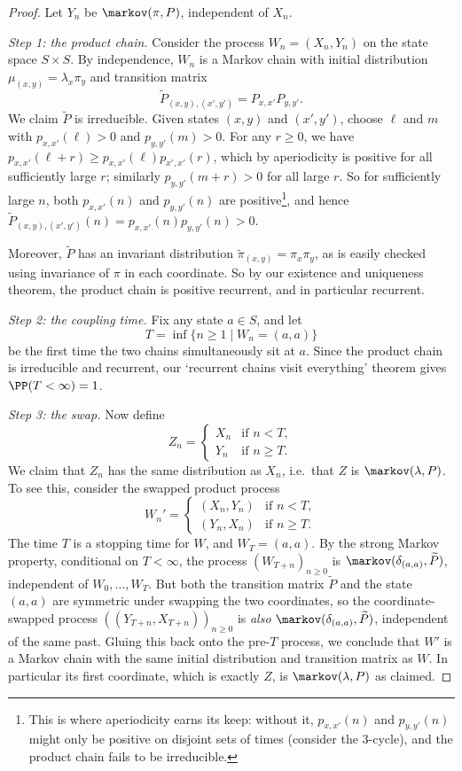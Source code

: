 \documentclass[a4paper]{scrartcl}
\begin{document}
\begin{proof}
	Let $Y_n$ be $\markov(\pi, P)$, independent of $X_n$.

	\emph{Step 1: the product chain.} Consider the process $W_n = (X_n, Y_n)$ on the state space $S \times S$. By independence, $W_n$ is a Markov chain with initial distribution $\mu_{(x, y)} = \lambda_x \pi_y$ and transition matrix
	$$
	\widetilde{P}_{(x, y), (x', y')} = P_{x, x'}P_{y, y'}.
	$$
	We claim $\widetilde{P}$ is irreducible. Given states $(x, y)$ and $(x', y')$, choose $\ell$ and $m$ with $p_{x, x'}(\ell) > 0$ and $p_{y, y'}(m) > 0$. For any $r \geq 0$, we have $p_{x, x'}(\ell + r) \geq p_{x, x'}(\ell)p_{x', x'}(r)$, which by aperiodicity is positive for all sufficiently large $r$; similarly $p_{y, y'}(m + r) > 0$ for all large $r$. So for sufficiently large $n$, both $p_{x, x'}(n)$ and $p_{y, y'}(n)$ are positive\footnote{This is where aperiodicity earns its keep: without it, $p_{x, x'}(n)$ and $p_{y, y'}(n)$ might only be positive on disjoint sets of times (consider the 3-cycle), and the product chain fails to be irreducible.}, and hence
	$
	\widetilde{P}_{(x, y), (x', y')}(n) = p_{x, x'}(n)p_{y, y'}(n) > 0.
	$

	Moreover, $\widetilde{P}$ has an invariant distribution $\widetilde{\pi}_{(x, y)} = \pi_x \pi_y$, as is easily checked using invariance of $\pi$ in each coordinate. So by our existence and uniqueness theorem, the product chain is positive recurrent, and in particular recurrent.

	\emph{Step 2: the coupling time.} Fix any state $a \in S$, and let
	$$
	T = \inf\{n \geq 1 \mid W_n = (a, a)\}
	$$
	be the first time the two chains simultaneously sit at $a$. Since the product chain is irreducible and recurrent, our `recurrent chains visit everything' theorem gives $\PP(T < \infty) = 1$.

	\emph{Step 3: the swap.} Now define
	$$
	Z_n = \begin{cases}
		X_n &\mbox{if } n < T, \\
		Y_n &\mbox{if } n \geq T.
	   \end{cases}
	$$
	We claim that $Z_n$ has the same distribution as $X_n$, i.e.\ that $Z$ is $\markov(\lambda, P)$. To see this, consider the swapped product process
	$$
	W_n' = \begin{cases}
		(X_n, Y_n) &\mbox{if } n < T, \\
		(Y_n, X_n) &\mbox{if } n \geq T.
	   \end{cases}
	$$
	The time $T$ is a stopping time for $W$, and $W_T = (a, a)$. By the strong Markov property, conditional on $T < \infty$, the process $(W_{T + n})_{n \geq 0}$ is $\markov(\delta_{(a, a)}, \widetilde{P})$, independent of $W_0, \dots, W_T$. But both the transition matrix $\widetilde{P}$ and the state $(a, a)$ are symmetric under swapping the two coordinates, so the coordinate-swapped process $((Y_{T + n}, X_{T + n}))_{n \geq 0}$ is \emph{also} $\markov(\delta_{(a, a)}, \widetilde{P})$, independent of the same past. Gluing this back onto the pre-$T$ process, we conclude that $W'$ is a Markov chain with the same initial distribution and transition matrix as $W$. In particular its first coordinate, which is exactly $Z$, is $\markov(\lambda, P)$ as claimed.


\end{proof}
\end{document}
